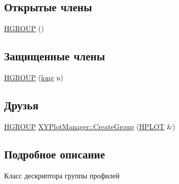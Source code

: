 \subsection*{Открытые члены}
\begin{DoxyCompactItemize}
\item 
\hyperlink{classxyplot_1_1_h_g_r_o_u_p_a3606052deb19c27928d3b1db7b9d80f7}{H\-G\-R\-O\-U\-P} ()
\end{DoxyCompactItemize}
\subsection*{Защищенные члены}
\begin{DoxyCompactItemize}
\item 
\hyperlink{classxyplot_1_1_h_g_r_o_u_p_a51a309994a7bf3af80eb8da9d3275c37}{H\-G\-R\-O\-U\-P} (\hyperlink{namespacexyplot_a27bc71b0bdfac09495e7e531d8a918c5}{long} n)
\end{DoxyCompactItemize}
\subsection*{Друзья}
\begin{DoxyCompactItemize}
\item 
\hyperlink{classxyplot_1_1_h_g_r_o_u_p}{H\-G\-R\-O\-U\-P} \hyperlink{classxyplot_1_1_h_g_r_o_u_p_aad7a10078d1a6fe1f17b6c0e5511135a}{X\-Y\-Plot\-Manager\-::\-Create\-Group} (\hyperlink{classxyplot_1_1_h_p_l_o_t}{H\-P\-L\-O\-T} \&)
\end{DoxyCompactItemize}


\subsection{Подробное описание}
Класс дескриптора группы профилей 

